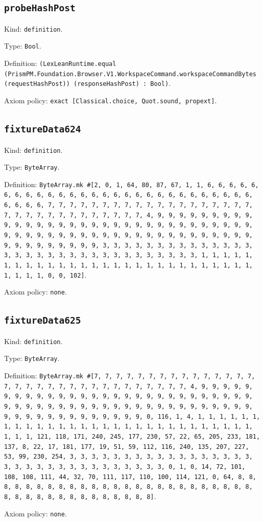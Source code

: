 \documentclass[11pt]{article}
\begin{document}
\subsection*{\texttt{probeHashPost}}
\noindent Kind: \texttt{definition}.\par
\noindent Type: \texttt{Bool}.\par
\noindent Definition: \texttt{(LexLeanRuntime.equal (PrismPM.Foundation.Browser.V1.WorkspaceCommand.workspaceCommandBytes (requestHashPost)) (responseHashPost) : Bool)}.\par
\noindent Axiom policy: \texttt{exact [Classical.choice, Quot.sound, propext]}.\par
\subsection*{\texttt{fixtureData624}}
\noindent Kind: \texttt{definition}.\par
\noindent Type: \texttt{ByteArray}.\par
\noindent Definition: \texttt{ByteArray.mk \#[2, 0, 1, 64, 80, 87, 67, 1, 1, 6, 6, 6, 6, 6, 6, 6, 6, 6, 6, 6, 6, 6, 6, 6, 6, 6, 6, 6, 6, 6, 6, 6, 6, 6, 6, 6, 6, 6, 6, 6, 6, 7, 7, 7, 7, 7, 7, 7, 7, 7, 7, 7, 7, 7, 7, 7, 7, 7, 7, 7, 7, 7, 7, 7, 7, 7, 7, 7, 7, 7, 7, 7, 7, 4, 9, 9, 9, 9, 9, 9, 9, 9, 9, 9, 9, 9, 9, 9, 9, 9, 9, 9, 9, 9, 9, 9, 9, 9, 9, 9, 9, 9, 9, 9, 9, 9, 9, 9, 9, 9, 9, 9, 9, 9, 9, 9, 9, 9, 9, 9, 9, 9, 9, 9, 9, 9, 9, 9, 9, 9, 9, 9, 9, 9, 9, 9, 9, 9, 3, 3, 3, 3, 3, 3, 3, 3, 3, 3, 3, 3, 3, 3, 3, 3, 3, 3, 3, 3, 3, 3, 3, 3, 3, 3, 3, 3, 3, 3, 3, 3, 1, 1, 1, 1, 1, 1, 1, 1, 1, 1, 1, 1, 1, 1, 1, 1, 1, 1, 1, 1, 1, 1, 1, 1, 1, 1, 1, 1, 1, 1, 1, 1, 0, 0, 102]}.\par
\noindent Axiom policy: \texttt{none}.\par
\subsection*{\texttt{fixtureData625}}
\noindent Kind: \texttt{definition}.\par
\noindent Type: \texttt{ByteArray}.\par
\noindent Definition: \texttt{ByteArray.mk \#[7, 7, 7, 7, 7, 7, 7, 7, 7, 7, 7, 7, 7, 7, 7, 7, 7, 7, 7, 7, 7, 7, 7, 7, 7, 7, 7, 7, 7, 7, 7, 7, 4, 9, 9, 9, 9, 9, 9, 9, 9, 9, 9, 9, 9, 9, 9, 9, 9, 9, 9, 9, 9, 9, 9, 9, 9, 9, 9, 9, 9, 9, 9, 9, 9, 9, 9, 9, 9, 9, 9, 9, 9, 9, 9, 9, 9, 9, 9, 9, 9, 9, 9, 9, 9, 9, 9, 9, 9, 9, 9, 9, 9, 9, 9, 9, 9, 0, 116, 1, 4, 1, 1, 1, 1, 1, 1, 1, 1, 1, 1, 1, 1, 1, 1, 1, 1, 1, 1, 1, 1, 1, 1, 1, 1, 1, 1, 1, 1, 1, 1, 1, 1, 121, 118, 171, 240, 245, 177, 230, 57, 22, 65, 205, 233, 181, 137, 8, 22, 17, 181, 177, 19, 51, 59, 112, 116, 240, 135, 207, 227, 53, 99, 230, 254, 3, 3, 3, 3, 3, 3, 3, 3, 3, 3, 3, 3, 3, 3, 3, 3, 3, 3, 3, 3, 3, 3, 3, 3, 3, 3, 3, 3, 3, 3, 3, 3, 0, 1, 0, 14, 72, 101, 108, 108, 111, 44, 32, 70, 111, 117, 110, 100, 114, 121, 0, 64, 8, 8, 8, 8, 8, 8, 8, 8, 8, 8, 8, 8, 8, 8, 8, 8, 8, 8, 8, 8, 8, 8, 8, 8, 8, 8, 8, 8, 8, 8, 8, 8, 8, 8, 8, 8, 8, 8, 8]}.\par
\noindent Axiom policy: \texttt{none}.\par
\end{document}
